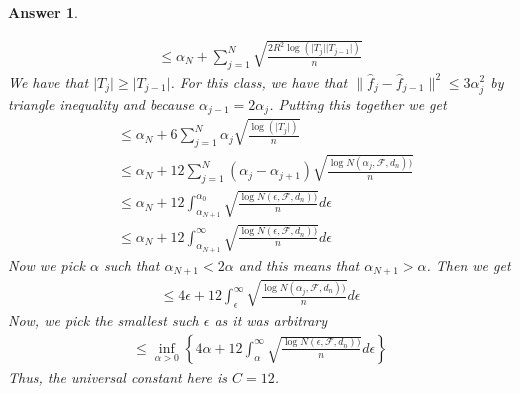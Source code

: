 \documentclass[12pt]{article}
\theoremstyle{colon}
\newtheorem*{answer}{Answer}
\begin{document}
\begin{answer}
\begin{enumerate}[label=\arabic*)]
\begin{gather*}
        \leq \alpha_N + \sum_{j=1}^N \sqrt{\frac{2 R^2 \log(\lvert T_j \rvert \lvert T_{j-1} \rvert)}{n}}
      \end{gather*}
      We have that $\lvert T_j \rvert \geq \lvert T_{j-1} \rvert$. For this class, we have that $\lVert \hat{f}_j - \hat{f}_{j-1} \rVert^2 \leq 3 \alpha_j^2$ by triangle inequality and because $\alpha_{j-1} = 2 \alpha_j$. Putting this together we get
      \begin{align*}
        &\leq \alpha_N + 6 \sum_{j=1}^N \alpha_j \sqrt{\frac{ \log(\lvert T_j \rvert)}{n}} \\
        &\leq \alpha_N + 12 \sum_{j=1}^N (\alpha_j - \alpha_{j+1}) \sqrt{\frac{\log N(\alpha_j, \mathcal{F}, d_n))}{n}} \\
        &\leq \alpha_N + 12 \int_{\alpha_{N+1}}^{\alpha_0} \sqrt{\frac{\log N(\epsilon, \mathcal{F}, d_n))}{n}} d \epsilon \\
        &\leq \alpha_N + 12 \int_{\alpha_{N+1}}^{\infty} \sqrt{\frac{\log N(\epsilon, \mathcal{F}, d_n))}{n}} d \epsilon
      \end{align*}
      Now we pick $\alpha$ such that $\alpha_{N+1} < 2 \alpha$ and this means that $\alpha_{N+1} > \alpha$. Then we get
      \begin{gather*}
        \leq 4 \epsilon + 12 \int_{\epsilon}^{\infty} \sqrt{\frac{\log N(\alpha_j, \mathcal{F}, d_n))}{n}} d \epsilon
      \end{gather*}
      Now, we pick the smallest such $\epsilon$ as it was arbitrary
      \begin{gather*}
        \leq \inf_{\alpha > 0} \left\{ 4 \alpha + 12 \int_{\alpha}^{\infty} \sqrt{\frac{\log N(\epsilon, \mathcal{F}, d_n))}{n}} d \epsilon \right\}
      \end{gather*}
      Thus, the universal constant here is $C = 12$.


\end{enumerate}
\end{answer}
\end{document}
